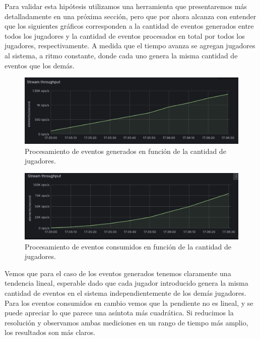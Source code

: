 Para validar esta hipótesis utilizamos una herramienta que presentaremos más detalladamente en una próxima sección, pero que por ahora alcanza con entender que los siguientes gráficos corresponden a la cantidad de eventos generados entre todos los jugadores
y la cantidad de eventos procesados en total por todos los jugadores, respectivamente. A medida que el tiempo avanza se agregan jugadores al sistema, a ritmo constante, donde cada uno genera la misma cantidad de eventos que los demás.

\begin{figure}[htbp]
    \centering
    \includegraphics[width=1\textwidth]{../assets/stream-producer-metrics.png}
    \caption{Procesamiento de eventos generados en función de la cantidad de jugadores.}
\end{figure}

\newpage

\begin{figure}[htbp]
    \centering
    \includegraphics[width=1\textwidth]{../assets/stream-consumer-metrics.png}
    \caption{Procesamiento de eventos consumidos en función de la cantidad de jugadores.}
\end{figure}

Vemos que para el caso de los eventos generados tenemos claramente una tendencia lineal, esperable dado que cada jugador introducido genera la misma cantidad de eventos en el sistema independientemente de los demás jugadores.
Para los eventos consumidos en cambio vemos que la pendiente no es lineal, y se puede apreciar lo que parece una asíntota más cuadrática. Si reducimos la resolución y observamos ambas mediciones en un rango de tiempo más amplio,
los resultados son más claros.

